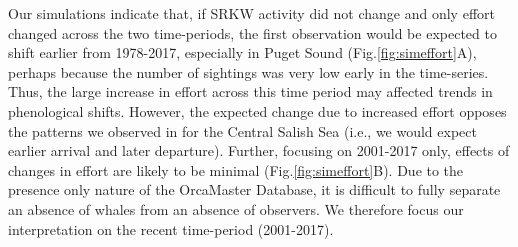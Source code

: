 \documentclass{article}
\begin{document}
\par Our simulations indicate that, if SRKW activity did not change and only effort changed across the two time-periods, the first observation would be expected to shift earlier from 1978-2017, especially in Puget Sound (Fig.\ref{fig:simeffort}A), perhaps because the number of sightings was very low early in the time-series. Thus, the large increase in effort across this time period may affected trends in phenological shifts.  However, the expected change due to increased effort opposes the patterns we observed in for the Central Salish Sea (i.e., we would expect earlier arrival and later departure). Further, focusing on 2001-2017 only, effects of changes in effort are likely to be minimal (Fig.\ref{fig:simeffort}B). Due to the presence only nature of the OrcaMaster Database, it is difficult to fully separate an absence of whales from an absence of observers. We therefore focus our interpretation on the recent time-period (2001-2017).




\pagebreak
\end{document}
